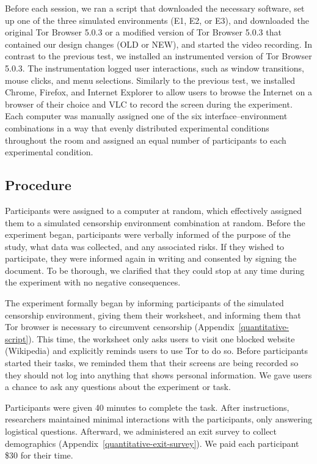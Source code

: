 \documentclass[USenglish,oneside,twocolumn]{article}
\begin{document}
Before each session, we ran a script that downloaded the necessary software, set up one of the three simulated environments (E1, E2, or E3), and downloaded the original Tor Browser 5.0.3 or a modified version of Tor Browser 5.0.3 that contained our design changes (OLD or NEW), and started the video recording. In contrast to the previous test, we installed an instrumented version of Tor Browser 5.0.3. The instrumentation logged user interactions, such as window transitions, mouse clicks, and menu selections. Similarly to the previous test, we installed Chrome, Firefox, and Internet Explorer to allow users to browse the Internet on a browser of their choice and VLC to record the screen during the experiment. Each computer was manually assigned one of the six interface--environment combinations in a way that evenly distributed experimental conditions throughout the room and assigned an equal number of participants to each experimental condition.

\subsection{Procedure}
Participants were assigned to a computer at random, which effectively assigned them to a simulated censorship environment combination at random. Before the experiment began, participants were verbally informed of the purpose of the study, what data was collected, and any associated risks. If they wished to participate, they were informed again in writing and consented by signing the document. To be thorough, we clarified that they could stop at any time during the experiment with no negative consequences. 

The experiment formally began by informing participants of the simulated censorship environment, giving them their worksheet, and informing them that Tor browser is necessary to circumvent censorship (Appendix~\ref{quantitative-script}). This time, the worksheet only asks users to visit one blocked website (Wikipedia) and explicitly reminds users to use Tor to do so. Before participants started their tasks, we reminded them that their screens are being recorded so they should not log into anything that shows personal information. We gave users a chance to ask any questions about the experiment or task. 

Participants were given 40 minutes to complete the task. After instructions, researchers maintained minimal interactions with the participants, only answering logistical questions. Afterward, we administered an exit survey to collect demographics (Appendix~\ref{quantitative-exit-survey}). We paid each participant \$30 for their time. 
\end{document}
